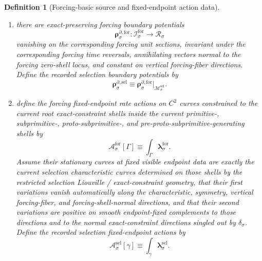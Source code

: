 \documentclass[11pt]{article}
\newcommand{\PhaseReadClass}[1]{\mathscr R_{#1}}
\newcommand{\ConstraintGap}[1]{\delta_{#1}}
\newcommand{\SelSpace}[1]{\mathcal M_{#1}^{\mathrm{sel}}}
\newcommand{\SelRateForm}[1]{\boldsymbol{\lambda}_{#1}^{\mathrm{sel}}}
\newcommand{\SelBoundarySource}[1]{\boldsymbol{\rho}_{#1}^{\partial,\mathrm{sel}}}
\newcommand{\SelAction}[1]{\mathscr A_{#1}^{\mathrm{sel}}}
\newcommand{\ForSpace}[1]{\mathcal I_{#1}^{\mathrm{for}}}
\newcommand{\ForRateForm}[1]{\boldsymbol{\lambda}_{#1}^{\mathrm{for}}}
\newcommand{\ForBoundarySource}[1]{\boldsymbol{\rho}_{#1}^{\partial,\mathrm{for}}}
\newcommand{\ForAction}[1]{\mathscr A_{#1}^{\mathrm{for}}}
\newtheorem{definition}{Definition}
\begin{document}
\begin{definition}[Forcing-basic source and fixed-endpoint action data]
\begin{enumerate}
\begin{equation}
    \end{equation}
    \item there are exact-preserving forcing boundary potentials
    \[
    \ForBoundarySource{\sigma}:\ForSpace{\sigma}\to\PhaseReadClass{\sigma}
    \]
    vanishing on the corresponding forcing unit sections, invariant under the corresponding forcing time reversals, annihilating vectors normal to the forcing zero-shell locus, and constant on vertical forcing-fiber directions. Define the recorded selection boundary potentials by
    \begin{equation}
    \SelBoundarySource{\sigma}\equiv \ForBoundarySource{\sigma}|_{\SelSpace{\sigma}}.
    \label{eq:selection_boundary_from_forcing}
    \end{equation}
    \item define the forcing fixed-endpoint rate actions on \(C^2\) curves constrained to the current root exact-constraint shells inside the current primitive-, subprimitive-, proto-subprimitive-, and pre-proto-subprimitive-generating shells by
    \begin{equation}
    \ForAction{\sigma}[\Gamma]\equiv \int_\Gamma \ForRateForm{\sigma}.
    \label{eq:forcing_action}
    \end{equation}
    Assume their stationary curves at fixed visible endpoint data are exactly the current selection characteristic curves determined on those shells by the restricted selection Liouville / exact-constraint geometry, that their first variations vanish automatically along the characteristic, symmetry, vertical forcing-fiber, and forcing-shell-normal directions, and that their second variations are positive on smooth endpoint-fixed complements to those directions and to the normal exact-constraint directions singled out by \(\ConstraintGap{\sigma}\). Define the recorded selection fixed-endpoint actions by
    \begin{equation}
    \SelAction{\sigma}[\gamma]\equiv \int_\gamma \SelRateForm{\sigma}.
    \label{eq:selection_action_from_forcing}
    \end{equation}
\end{enumerate}
\end{definition}
\end{document}
